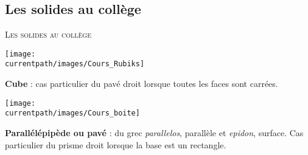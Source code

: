 \begin{changemargin}{-5mm}{-15mm}
    \section{Les solides au collège}
    \begin{Mind}
        \begin{Bulle}[Nom=CadreTitre,Rayon=5,Largeur=7cm,Ancre={-5,0}]
            \begin{center}
                \LARGE\textsc{Les solides au collège}
            \end{center}
        \end{Bulle}
        \begin{Bulle}[Nom=Polyedres, Rayon=5,Largeur=0.7cm,Ancre={-14,5},CTrace=blue]
            \begin{center}
            \end{center}
        \end{Bulle}
        \begin{Bulle}[Nom=Prismes, Rayon=5,Largeur=0.55\linewidth,Ancre={-8,6},CTrace=blue]
            \begin{center}
                \hfill \Solide[Nom=pave,Sommets=false,Largeur=0.7,Hauteur=0.7,Profondeur=0.7] \hfill \texttt{[image: \\currentpath/images/Cours\_Rubiks]}\hfill\phantom{rrr}
            \end{center}

            \begin{minipage}{\linewidth}
                {\bf Cube} : cas particulier du pavé droit lorsque toutes les faces sont carrées.
            \end{minipage}
            
            \begin{center}
                \hfill \Solide[Nom=pave,Sommets=false,Largeur=1.05,Hauteur=0.525,Profondeur=0.7] \hfill \texttt{[image: \\currentpath/images/Cours\_boite]}\hfill\phantom{rrr}
            \end{center}

            \begin{minipage}{\linewidth}
                {\bf Parallélépipède ou pavé} : du grec {\it parallelos}, parallèle et {\it epidon}, surface. Cas particulier du prisme droit lorsque la base est un rectangle.
            \end{minipage}
            

\end{Bulle}
\end{Mind}
\end{changemargin}

